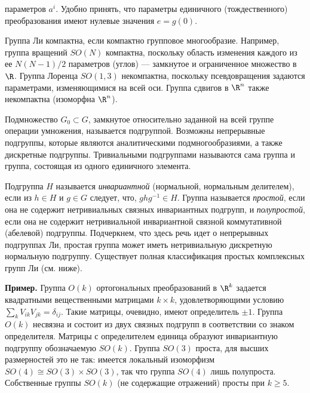 \documentclass[a4paper
]{article}
\begin{document}
параметров $a^i$. Удобно принять, что параметры единичного
(тождественного) преобразования имеют нулевые значения $e=g(0)$.
\par
Группа Ли компактна, если компактно групповое многообразие.
Например, группа вращений $SO(N)$ компактна, поскольку область
изменения каждого из ее $N(N-1)/2$ параметров (углов) ---
замкнутое и ограниченное множество в $\R$. Группа Лоренца
$SO(1,3)$ некомпактна, поскольку псевдовращения задаются
параметрами, изменяющимися на всей оси. Группа сдвигов в $\R^n$
также некомпактна (изоморфна $\R^n$). \par Подмножество
$G_0\subset G$, замкнутое относительно заданной на всей группе
операции умножения, называется подгруппой. Возможны непрерывные
подгруппы, которые являются аналитическими подмногообразиями, а
также дискретные подгруппы. Тривиальными подгруппами называются
сама группа и группа, состоящая из одного единичного элемента.
\par Подгруппа $H$ называется {\em инвариантной} (нормальной,
нормальным делителем), если из $h\in H$ и $g\in G$ следует, что,
$ghg^{-1}\in H$. Группа называется {\em простой}, если она не
содержит нетривиальных  связных инвариантных подгрупп, и {\em
полупростой}, если она не содержит нетривиальной инвариантной
связной коммутативной (абелевой) подгруппы. Подчеркнем, что здесь
речь идет о непрерывных подгруппах Ли, простая группа может иметь
нетривиальную дискретную нормальную подгруппу. Существует полная
классификация простых комплексных групп Ли (см. ниже).\par {\bf
Пример.} Группа $O(k)$ ортогональных преобразований в $\R^k$
задается квадратными вещественными матрицами $k\times k$,
удовлетворяющими условию \\$\sum_k V_{ik}V_{jk} = \delta_{ij}$.
Такие матрицы, очевидно, имеют определитель $\pm 1$. Группа $O(k)$
несвязна и состоит из двух связных подгрупп в соответствии со
знаком определителя. Матрицы с определителем единица образуют
инвариантную подгруппу обозначаемую $SO(k)$. Группа $SO(3)$
проста, для высших размерностей это не так: имеется локальный
изоморфизм $SO(4)\cong SO(3)\times SO(3)$, так что группа $SO(4)$
лишь полупроста. Собственные группы $SO(k)$ (не содержащие
отражений) просты при $k\geq 5$.
\end{document}
